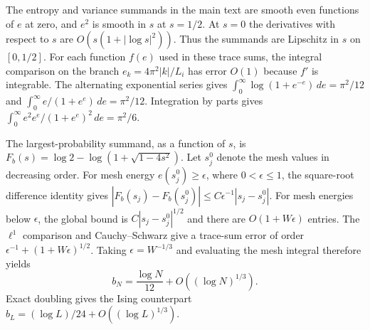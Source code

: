 The entropy and variance summands in the main text are smooth even
functions of $e$ at zero, and $e^2$ is smooth in $s$ at $s=1/2$.
At $s=0$ the derivatives with respect to $s$ are
$O(s(1+|\log s|^2))$. Thus the summands are Lipschitz in $s$ on
$[0,1/2]$. For each function $f(e)$ used in these trace sums,
the integral comparison on the branch $e_k=4\pi^2|k|/L_i$ has error
$O(1)$ because $f'$ is integrable. The alternating exponential series
gives $\int_0^\infty\log(1+e^{-e})\,de=\pi^2/12$ and
$\int_0^\infty e/(1+e^e)\,de=\pi^2/12$. Integration by parts gives
$\int_0^\infty e^2 e^e/(1+e^e)^2\,de=\pi^2/6$.

The largest-probability summand, as a function of $s$, is
$F_b(s)=\log2-\log(1+\sqrt{1-4s^2})$. Let $s_j^0$ denote the mesh
values in decreasing order. For mesh energy $e(s_j^0)\ge\epsilon$,
where $0<\epsilon\le1$, the square-root difference identity gives
$|F_b(s_j)-F_b(s_j^0)|\le C\epsilon^{-1}|s_j-s_j^0|$. For mesh
energies below $\epsilon$, the global bound is
$C|s_j-s_j^0|^{1/2}$ and there are $O(1+W\epsilon)$ entries. The
$\ell^1$ comparison and Cauchy--Schwarz give a trace-sum error of order
$\epsilon^{-1}+(1+W\epsilon)^{1/2}$. Taking $\epsilon=W^{-1/3}$
and evaluating the mesh integral therefore yields
\[
 b_N=\frac{\log N}{12}+O((\log N)^{1/3}).
\]
Exact doubling gives the Ising counterpart
$b_L=(\log L)/24+O((\log L)^{1/3})$.
